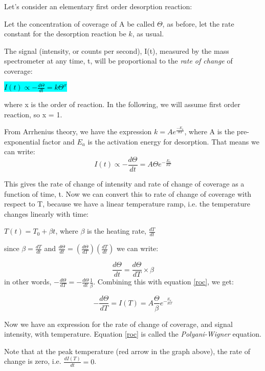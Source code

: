 \documentclass[ignorenonframetext]{beamer}
\begin{document}
Let's consider an elementary first order desorption reaction: 

Let the concentration of coverage of A be called \(\Theta\), as before, let the rate constant for the desorption reaction be \(k\), as usual.

The signal (intensity, or counts per second), I(t), measured by the mass spectrometer at any time, t, will be proportional to the \textit{rate of change} of coverage:

\begin{center}\colorbox{cyan}{\textcolor{black}{\(I(t) \propto -\frac{d\Theta}{dt}=k\Theta^x\)}}\end{center}

where x is the order of reaction. In the following, we will assume first order reaction, so x = 1.

From Arrhenius theory, we have the expression \(k = Ae^{\frac{-E_a}{RT}}\), where A is the pre-exponential factor and \(E_a\) is the activation energy for desorption. That means we can write:
\begin{equation}\label{roc} I(t) \propto - \frac{d\Theta}{dt} = A\Theta e^{-\frac{E_a}{RT}}\end{equation}

This gives the rate of change of intensity and rate of change of coverage as a function of time, t. Now we can convert this to rate of change of coverage with respect to T, because we have a linear temperature ramp, i.e. the temperature changes linearly with time:

\(T(t) = T_0 + \beta t\), where \(\beta\) is the heating rate, \(\frac{dT}{dt}\)

since \(\beta = \frac{dT}{dt}\) and \(\frac{d\Theta}{dt} = \left(\frac{d\Theta}{dT}\right)\left(\frac{dT}{dt}\right)\) we can write:

\[\frac{d\Theta}{dt} = \frac{d\Theta}{dT} \times \beta\]
in other words, \(-\frac{d\Theta}{dT} = -\frac{d\Theta}{dt} \frac{1}{\beta}\). Combining this with equation \ref{roc}, we get:

\begin{equation}
\boxed{-\frac{d\Theta}{dT} =I(T) =  A\frac{\Theta}{\beta}e^{-^{E_a}_{RT}}}
\end{equation}

Now we have an expression for the rate of change of coverage, and signal intensity, with temperature. Equation \ref{roc} is called the \textit{Polyani-Wigner} equation.

Note that at the peak temperature (red arrow in the graph above), the rate of change is zero, i.e. \(\frac{dI(T)}{dt}=0\).
\end{document}
